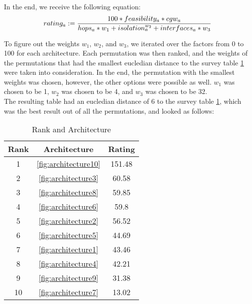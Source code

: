 In the end, we receive the following equation:\\
\begin{equation}
    rating_{a} := \frac{100 * feasibility_{a} * cgw_{a}}{hops_{a}*w_{1} + isolation_{a}^{w_{2}} + interfaces_{a}*w_{3}} \label{eq:rating}\\\\
\end{equation}

\hfill \break

To figure out the weights $w_{1}$, $w_{2}$, and $w_{3}$, we iterated over the factors from 0 to 100 for each architecture.
Each permutation was then ranked, and the weights of the permutations that had the smallest eucledian distance to the survey table \ref{table:survey} were taken into consideration.
In the end, the permutation with the smallest weights was chosen, however, the other options were possible as well.
$w_{1}$ was chosen to be 1, $w_{2}$ was chosen to be 4, and $w_{3}$ was chosen to be 32.\\

The resulting table had an eucledian distance of 6 to the survey table \ref{table:survey}, which was the best result out of all the permutations, and looked as follows:\\

\begin{table}[h]
    \label{table:survey}
    \centering
    \caption{Rank and Architecture}
    \begin{tabular}{ |c|c|c| } 
    \hline
    Rank & Architecture & Rating\\
    \hline
    1 & \ref{fig:architecture10} & 151.48\\
    2 & \ref{fig:architecture3} & 60.58\\
    3 & \ref{fig:architecture8} & 59.85\\
    4 & \ref{fig:architecture6} & 59.8\\
    5 & \ref{fig:architecture2} & 56.52\\
    6 & \ref{fig:architecture5} & 44.69\\
    7 & \ref{fig:architecture1} & 43.46\\
    8 & \ref{fig:architecture4} & 42.21\\
    9 & \ref{fig:architecture9} & 31.38\\
    10 & \ref{fig:architecture7} & 13.02\\
    \hline
    \end{tabular}
\end{table}

